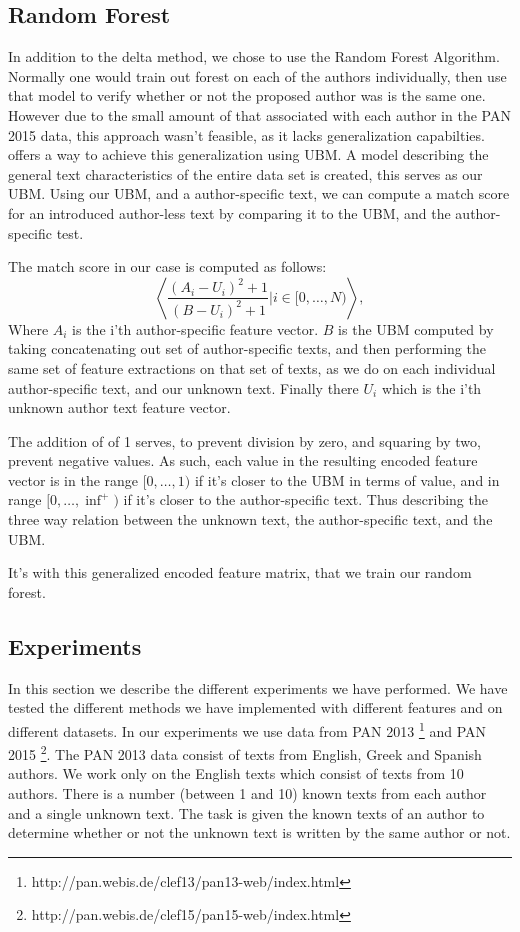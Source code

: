 \subsection{Random Forest}
In addition to the delta method, we chose to use the Random Forest Algorithm.
Normally one would train out forest on each of the authors individually, then
use that model to verify whether or not the proposed author was is the same
one.
However due to the small amount of that associated with each author in the PAN
2015 data, this approach wasn't feasible, as it lacks generalization
capabilties. \cite{pacheco2015} offers a way to achieve this generalization
using \gls{UBM}. A model describing the general text characteristics of the
entire data set is created, this serves as our \gls{UBM}. Using our \gls{UBM},
and a author-specific text, we can compute a match score for an introduced
author-less text by comparing it to the \gls{UBM}, and the author-specific test.

The match score in our case is computed as follows:
\begin{equation}
    \left\langle
        \dfrac{(A_i-U_i)^2+1}{(B-U_i)^2+1}|i \in [0,\dots, N)
    \right\rangle,
\end{equation}
Where $A_i$ is the i'th author-specific feature vector. $B$ is the \gls{UBM}
computed by taking concatenating out set of author-specific texts, and then
performing the same set of feature extractions on that set of texts, as we do on
each individual author-specific text, and our unknown text. Finally there $U_i$
which is the i'th unknown author text feature vector.

The addition of of 1 serves, to prevent division by zero, and squaring by two,
prevent negative values. As such, each value in the resulting encoded feature
vector is in the range $[0,\dots, 1)$ if it's closer to the \gls{UBM} in terms
of value, and in range $[0,\dots, \inf^+)$ if it's closer to the author-specific
text. Thus describing the three way relation between the unknown text, the
author-specific text, and the \gls{UBM}.

It's with this generalized encoded feature matrix, that we train our random
forest.

\subsection{Experiments}
In this section we describe the different experiments we have performed.
We have tested the different methods we have implemented with different
features and on different datasets. In our experiments we use data from PAN
2013 \footnote{http://pan.webis.de/clef13/pan13-web/index.html} and PAN 2015
\footnote{http://pan.webis.de/clef15/pan15-web/index.html}. The PAN 2013 data
consist of texts from English, Greek and Spanish authors. We work only on the
English texts which consist of texts from 10 authors. There is a number (between
1 and 10) known texts from each author and a single unknown text. The task is
given the known texts of an author to determine whether or not the unknown text
is written by the same author or not.


